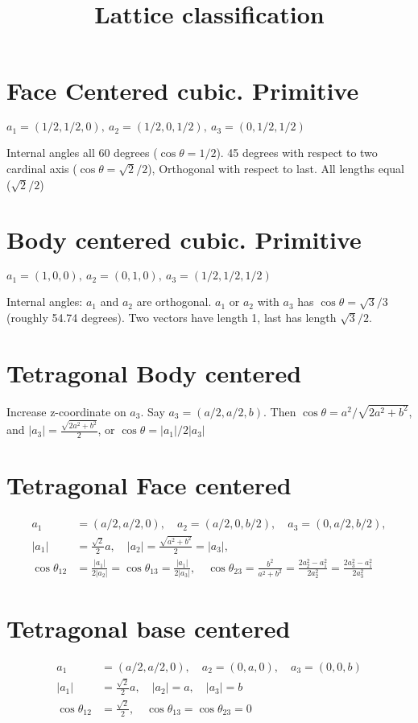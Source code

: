 \documentclass[a4paper,10pt]{article} 	%
\title{Lattice classification}
\author{}
\date{}
\numberwithin{equation}{section}
\begin{document}
	\maketitle

	\section{Face Centered cubic. Primitive}
	$a_1 = (1/2, 1/2, 0),\ a_2 = (1/2, 0, 1/2),\ a_3 = (0, 1/2, 1/2)$
	
	Internal angles all 60 degrees ($\cos \theta = 1/2$). 45 degrees with respect to two cardinal axis ($\cos \theta = \sqrt{2}/2$), Orthogonal with respect to last. All lengths equal ($\sqrt{2}/2$)
	
	\section{Body centered cubic. Primitive}
	$ a_1 = (1,0,0),\ a_2 = (0,1,0),\ a_3 = (1/2,1/2,1/2) $
	
	Internal angles: $a_1$ and $a_2$ are orthogonal. $a_1$ or $a_2$ with $a_3$ has $\cos \theta = \sqrt{3}/3 $ (roughly 54.74 degrees). Two vectors have length 1, last has length $\sqrt{3}/2$.
	
	\section{Tetragonal Body centered}
	Increase z-coordinate on $a_3$. Say $a_3 = (a/2,a/2,b) $. Then $\cos \theta = a^2/\sqrt{2a^2+b^2} $, and $|a_3| = \frac{\sqrt{2a^2+b^2}}{2}$, or $ \cos \theta = |a_1|/2|a_3|$
	
	\section{Tetragonal Face centered}
	\begin{align}
		a_1 &= (a/2,a/2,0), \quad a_2 = (a/2,0,b/2), \quad a_3 = (0,a/2,b/2),\\
		|a_1| &= \frac{\sqrt{2}}{2} a, \quad |a_2| = \frac{\sqrt{a^2+b^2}}{2} = |a_3|, \\
		\cos \theta_{12} & = \frac{|a_1|}{2|a_2|} = \cos \theta_{13} = \frac{|a_1|}{2 |a_3|}, \quad \cos \theta_{23} = \frac{b^2}{a^2+b^2} = \frac{2a_2^2 - a_1^2}{2a_2^2} = \frac{2a_3^2 - a_1^2}{2a_3^2}
	\end{align}
	\section{Tetragonal base centered}
	\begin{align}
		a_1 &= (a/2,a/2,0), \quad a_2 = (0,a,0), \quad a_3 = (0,0,b) \\
		|a_1| &= \frac{\sqrt{2}}{2} a, \quad |a_2| = a, \quad |a_3| = b \\
		\cos \theta_{12} &= \frac{\sqrt{2}}{2}, \quad \cos \theta_{13} = \cos\theta_{23} = 0
	\end{align}
	
\end{document}
